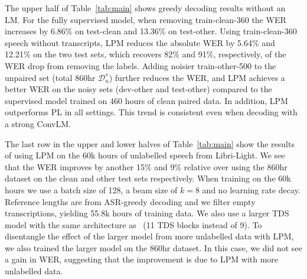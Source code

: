 The upper half of Table~\ref{tab:main} shows greedy decoding results without an LM. 
For the fully supervised model, when removing train-clean-360 the WER increases by 6.86\% on test-clean and 13.36\% on test-other.
Using train-clean-360 speech without transcripts, LPM reduces the absolute WER by 5.64\% and 12.21\% on the two test sets, which recovers 82\% and 91\%, respectively, of the WER drop from removing the labels.
Adding noisier train-other-500 to the unpaired set (total 860hr $\mathcal{D}_u^s$) further reduces the WER, and LPM achieves a better WER on the noisy sets (dev-other and test-other) compared to the supervised model trained on 460 hours of clean paired data.
In addition, LPM outperforms PL in all settings.
This trend is consistent even when decoding with a strong ConvLM.

The last row in the upper and lower halves of Table~\ref{tab:main} show the results of using LPM on the 60k hours of unlabelled speech from Libri-Light. We see that the WER improves by another 15\% and 9\% relative over using the 860hr dataset on the clean and other test sets respectively. When training on the 60k hours we use a batch size of 128, a beam size of $k\!=8\!$ and no learning rate decay. Reference lengths are from ASR-greedy decoding and we filter empty transcriptions, yielding 55.8k hours of training data. We also use a larger TDS model with the same architecture as~\citet{hannun2019sequence} (11 TDS blocks instead of 9). To disentangle the effect of the larger model from more unlabelled data with LPM, we also trained the larger model on the 860hr dataset. In this case, we did not see a gain in WER, suggesting that the improvement is due to LPM with more unlabelled data.

